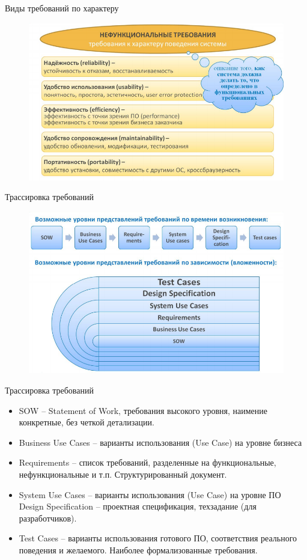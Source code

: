 \documentclass{beamer}
\begin{document}
\begin{frame}[t]{Виды требований по характеру}
\begin{figure}[h]
\centering
\includegraphics[scale=0.5]{images/lec02-pic10.png}
\end{figure}
\end{frame}    

\begin{frame}[t]{Трассировка требований}
\begin{figure}[h]
\centering
\includegraphics[scale=0.5]{images/lec02-pic11.png}
\end{figure}
\end{frame}    

\begin{frame}[t]{Трассировка требований}
\begin{itemize}
\item SOW – Statement of Work, требования высокого уровня, наимение конкретные, без четкой детализации.
\item Business Use Cases – варианты использования (Use Case) на уровне бизнеса
\item Requirements – список требований, разделенные на функциональные, нефункциональные и т.п. Структурированный документ.
\item System Use Cases – варианты использования (Use Case) на уровне ПО Design Specification – проектная спецификация, техзадание (для разработчиков).
\item Test Cases – варианты использования готового ПО, соответствия реального поведения и желаемого. Наиболее формализованные требования.
\end{itemize}
\end{frame}
\end{document}
